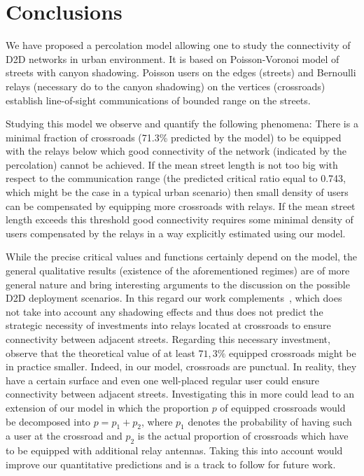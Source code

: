 \documentclass[conference]{IEEEtran}
\begin{document}
\section{Conclusions}%
\label{s.Conclusions}
We have proposed a percolation model allowing one to study the connectivity 
of D2D  networks  in urban environment. It is
based on  Poisson-Voronoi model of streets with canyon shadowing.
Poisson users on the edges (streets) and Bernoulli relays (necessary do to the canyon shadowing) on the vertices (crossroads) establish  line-of-sight communications of bounded range on the streets.

Studying this model we observe and quantify the following phenomena:
There is a minimal fraction of crossroads (71.3\% predicted by the model) to be equipped with the relays below which good connectivity of the network (indicated by the percolation) cannot be achieved. If the mean street length is not too big  with  
respect to the communication range (the predicted critical ratio equal to 0.743, which  might be the case in a typical urban scenario) then small density  of  users  can  be  compensated by equipping more  crossroads with relays. 
If the mean street length exceeds this threshold
good connectivity requires some minimal density of users compensated by the relays
in a way  explicitly estimated using our model.


While the precise critical values and functions 
certainly depend on the model, the general qualitative results 
(existence of the aforementioned regimes) are of more general nature and bring interesting  arguments to the discussion on the  possible D2D deployment scenarios.
In this regard our work complements~\cite{cali2018percolation}, which 
does  not take into account any shadowing effects and thus does not predict
the strategic necessity of investments into relays located at crossroads to ensure connectivity between adjacent streets.
Regarding this necessary investment, observe that
the theoretical value of at least $71,3\%$ equipped crossroads might be 
in practice smaller. Indeed, in our model, crossroads are punctual. In reality, they have a certain surface and even one well-placed regular user could ensure connectivity between adjacent streets.
Investigating this in more could lead to an extension of our model in which the proportion $p$ of equipped crossroads would be decomposed into $p=p_1+p_2$, where $p_1$ denotes the probability of having such a user at the crossroad and $p_2$ is the actual proportion of crossroads which have to be equipped with additional relay antennas. 
Taking this into account would improve our quantitative predictions and is a track to follow for future work.
\end{document}
